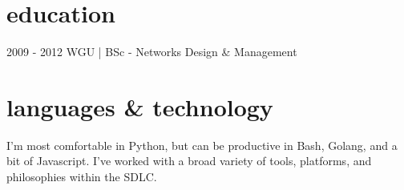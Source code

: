 \documentclass[]{mv_cv}
\begin{document}
\section{education}
\begin{content}
  {2009 - 2012 WGU | BSc - Networks Design \& Management}
\end{content}

\section{languages \& technology}
\begin{content}
  {I'm most comfortable in Python, but can be productive in Bash, Golang, and a bit of Javascript. I've worked with a broad variety of tools, platforms, and philosophies within the SDLC.}
\end{content}

\thispagestyle{empty}
\end{document}
